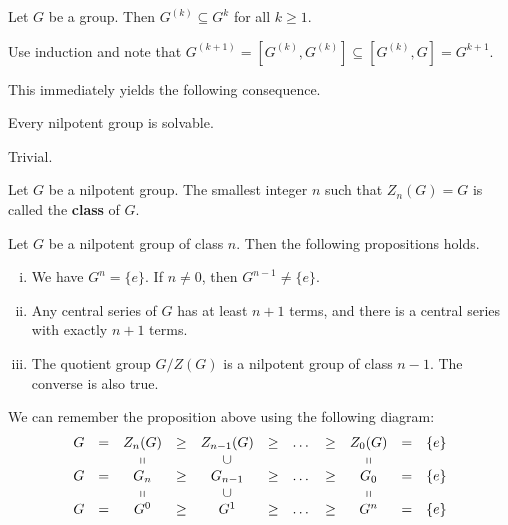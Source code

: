 \begin{lemma}
	Let $G$ be a group. Then $G^{(k)}\subseteq G^k$ for all $k\geq 1$.
\end{lemma}
\begin{sketch}
	Use induction and note that $G^{(k+1)} = [G^{(k)},G^{(k)}] \subseteq [G^{(k)},G]  = G^{k+1}$.
\end{sketch}
This immediately yields the following consequence.
\begin{proposition} \label{prop-nil-implies-sol}
	Every nilpotent group is solvable.
\end{proposition}
\begin{sketch}
	Trivial.
\end{sketch}

\begin{definition}
	Let $G$ be a nilpotent group. The smallest integer $n$ such that $Z_n(G) = G$ is called the \textbf{class} of $G$.
\end{definition}

 
\begin{proposition} \label{prop-nilpotent-class}
	Let $G$ be a nilpotent group of class $n$. Then the following propositions holds.
	\begin{enumerate}[(i)]
		\item We have $G^n = \{e\}$. If $n \neq 0$, then $G^{n-1} \neq \{e\}$.
		\item Any central series of $G$ has at least $n+1$ terms, and there is a central series with exactly $n+1$ terms.
		\item The quotient group $G/Z(G)$ is a nilpotent group of class $n-1$. The converse is also true.
	\end{enumerate}
\end{proposition}
\begin{remark}
	We can remember the proposition above  using the following diagram:
	\begin{equation*}
		\begin{array}{ccccccccccc}
			G&=&Z_n(G) & \geq & Z_{n-1}(G) & \geq & \dots & \geq & Z_0(G) &=& \{e\} \\
			&&\shortparallel & & \cup & & & & \shortparallel&&\\
			G &= &G_n & \geq & G_{n-1} & \geq & \dots & \geq & G_0 &=& \{e\} \\
			&&\shortparallel & & \cup & & & & \shortparallel &&\\
			G &= &G^0 & \geq & G^1 & \geq & \dots & \geq & G^n &=& \{e\}
		\end{array}
	\end{equation*}
\end{remark}

